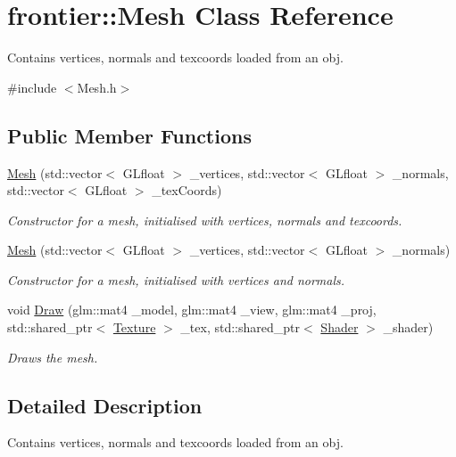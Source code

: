 \hypertarget{classfrontier_1_1_mesh}{}\section{frontier\+:\+:Mesh Class Reference}
\label{classfrontier_1_1_mesh}


Contains vertices, normals and texcoords loaded from an obj.  




{\ttfamily \#include $<$Mesh.\+h$>$}

\subsection*{Public Member Functions}
\begin{DoxyCompactItemize}
\item 
\hyperlink{classfrontier_1_1_mesh_ae41b011b5af82b8413f7748693b709f7}{Mesh} (std\+::vector$<$ G\+Lfloat $>$ \+\_\+vertices, std\+::vector$<$ G\+Lfloat $>$ \+\_\+normals, std\+::vector$<$ G\+Lfloat $>$ \+\_\+tex\+Coords)
\begin{DoxyCompactList}\small\item\em Constructor for a mesh, initialised with vertices, normals and texcoords. \end{DoxyCompactList}\item 
\hyperlink{classfrontier_1_1_mesh_a5bc251528ec00975e49ba3f156955a3f}{Mesh} (std\+::vector$<$ G\+Lfloat $>$ \+\_\+vertices, std\+::vector$<$ G\+Lfloat $>$ \+\_\+normals)
\begin{DoxyCompactList}\small\item\em Constructor for a mesh, initialised with vertices and normals. \end{DoxyCompactList}\item 
void \hyperlink{classfrontier_1_1_mesh_a37daa84e24b750bb8b488794fa34ed1e}{Draw} (glm\+::mat4 \+\_\+model, glm\+::mat4 \+\_\+view, glm\+::mat4 \+\_\+proj, std\+::shared\+\_\+ptr$<$ \hyperlink{classfrontier_1_1_texture}{Texture} $>$ \+\_\+tex, std\+::shared\+\_\+ptr$<$ \hyperlink{classfrontier_1_1_shader}{Shader} $>$ \+\_\+shader)
\begin{DoxyCompactList}\small\item\em Draws the mesh. \end{DoxyCompactList}\end{DoxyCompactItemize}


\subsection{Detailed Description}
Contains vertices, normals and texcoords loaded from an obj. 

